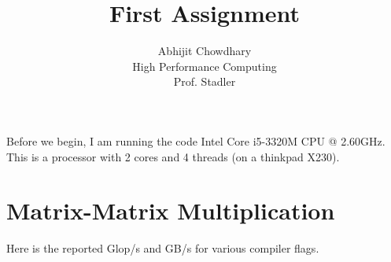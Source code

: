 \documentclass[12pt]{article}
\begin{document}
 

 
\title{First Assignment}%
\author{Abhijit Chowdhary\\ %
High Performance Computing \\
Prof. Stadler} %

\maketitle

Before we begin, I am running the code Intel Core i5-3320M CPU @ 2.60GHz. This
is a processor with 2 cores and 4 threads (on a thinkpad X230).

\section{Matrix-Matrix Multiplication}

Here is the reported Glop/s and GB/s for various compiler flags.
\end{document}
